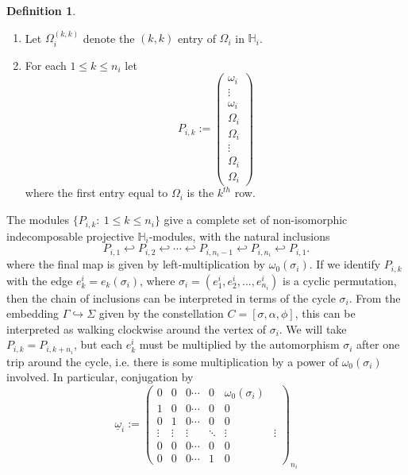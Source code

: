 \documentclass[11pt,oneside]{amsbook}
\numberwithin{equation}{section}
\theoremstyle{plain}
\theoremstyle{definition}
\newtheorem{defn}[theorem]{Definition}
\theoremstyle{remark}
\newcommand{\HH}{\mathbb{H}}
\begin{document}
\begin{defn}
\begin{enumerate}
\[\begin{pmatrix}
				\Omega_i & \Omega_i & \Omega_i & \cdots & \Omega_i & \omega_i \\
				\Omega_i & \Omega_i & \Omega_i & \cdots & \Omega_i & \Omega_i \\
			\end{pmatrix}_{n(i)}
			\]
			\item Let $\Omega_i^{(k,k)}$ denote the $(k,k)$ entry of $\Omega_i$ in $\HH_i$. 
			\item For each $1 \leq k \leq n_i$ let
			\[ P_{i,k}:= \begin{pmatrix}
				\omega_i \\ \vdots \\ \omega_i \\ \Omega_i \\ \Omega_i \\\vdots \\ \Omega_i \\ \Omega_i
			\end{pmatrix} \]
			where the first entry equal to $\Omega_i$ is the $k^{th}$ row. 
		\end{enumerate}
	\end{defn}
	
	The modules $\{P_{i,k}: \ 1 \leq k \leq n_i\}$ give a complete set of non-isomorphic indecomposable projective $\HH_i
	$-modules, with the natural inclusions
	\[ P_{i,1} \hookleftarrow P_{i,2} \hookleftarrow \cdots \hookleftarrow P_{i,n_i-1} \hookleftarrow P_{i,n_i} 
	\hookleftarrow P_{i,1}. \]
	where the final map is given by left-multiplication by $\omega_0(\sigma_i)$. If we identify $P_{i,k}$ with the edge 
	$e_k^i = e_k(\sigma_i)$, where $\sigma_i = (e_1^i, e_2^i, ..., e_{n_i}^i)$ is a cyclic permutation, then the chain of 
	inclusions can be interpreted in terms of the cycle $\sigma_i$. From the embedding $\Gamma
	\hookrightarrow \Sigma$ given by the constellation $C = [\sigma, \alpha, \phi]$, this can be interpreted as walking 
	clockwise around the vertex of $\sigma_i$. We will take $P_{i,k} = P_{i,k+n_i}$, but each $e_k^i$ must be 
	multiplied by the automorphism $\sigma_i$ after one trip around the cycle, i.e. there is some multiplication by a 
	power of $\omega_0(\sigma_i)$ involved. 
	\indent In particular, conjugation by 
	\[ \underline{\omega}_i:= \begin{pmatrix}
		0 & 0 & 0 \cdots & 0 & \omega_0(\sigma_i) \\
		1 & 0 & 0 \cdots & 0 & 0 \\
		0 & 1 & 0 \cdots & 0 & 0 \\
		\vdots & \vdots & \vdots & \ddots & \vdots & \vdots \\
		0 & 0 & 0 \cdots & 0 & 0 \\
		0 & 0 & 0 \cdots & 1 & 0 
	\end{pmatrix}_{n_i} \]
\end{document}

